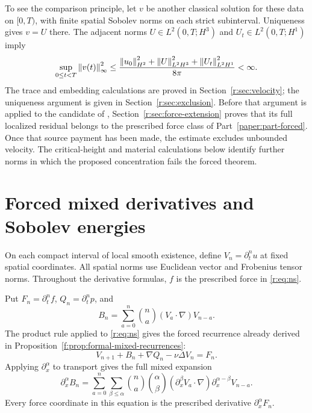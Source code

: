 To see the comparison principle, let \(v\) be another classical solution
for these data on \([0,T)\), with finite spatial Sobolev norms on each
strict subinterval. Uniqueness gives \(v=U\) there. The adjacent norms
\(U\in L^2(0,T;H^3)\) and \(U_t\in L^2(0,T;H^1)\) imply
\begin{equation}
 \sup_{0\le t<T}\left\lVert v(t)\right\rVert_\infty^2
 \le \frac{\left\lVert u_0\right\rVert_{H^2}^2+
       \left\lVert U\right\rVert_{L^2H^3}^2+\left\lVert U_t\right\rVert_{L^2H^1}^2}{8\pi}<\infty.
 \label{r:eq:intro-comparison}
\end{equation}
The trace and embedding calculations are proved in
Section~\ref{r:sec:velocity}; the uniqueness argument is given in
Section~\ref{r:sec:exclusion}.  Before that argument is applied to the
candidate of \cite{openai-paper}, Section~\ref{r:sec:force-extension} proves
that its full localized residual belongs to the prescribed force class of
Part~\ref{paper:part-forced}.  Once that source payment has been made, the estimate excludes
unbounded velocity. The
critical-height and material calculations below identify further
norms in which the proposed concentration fails the forced theorem.

\section{Forced mixed derivatives and Sobolev energies}\label{r:sec:forced-rows}

On each compact interval of local smooth existence, define
\(V_n=\partial_t^nu\) at fixed spatial coordinates. All spatial norms use
Euclidean vector and Frobenius tensor norms. Throughout the derivative formulas, \(f\) is the prescribed force in \eqref{r:eq:ns}.

Put \(F_n=\partial_t^nf\), \(Q_n=\partial_t^np\), and
\begin{equation}
 B_n=\sum_{a=0}^n\binom na(V_a\cdot\nabla)V_{n-a}.
 \label{r:eq:Bn}
\end{equation}
The product rule applied to \eqref{r:eq:ns} gives the forced recurrence already
derived in Proposition~\ref{f:prop:formal-mixed-recurrences}:
\begin{equation}
 V_{n+1}+B_n+\nabla Q_n-\nu\Delta V_n=F_n.
 \label{r:eq:row}
\end{equation}
Applying \(\partial_x^\alpha\) to transport gives the full mixed expansion
\begin{equation}
 \partial_x^\alpha B_n
 =\sum_{a=0}^n\sum_{\beta\le\alpha}
 \binom na\binom\alpha\beta
 (\partial_x^\beta V_a\cdot\nabla)
 \partial_x^{\alpha-\beta}V_{n-a}.
 \label{r:eq:mixed}
\end{equation}
Every force coordinate in this equation is the prescribed derivative
\(\partial_x^\alpha F_n\).

